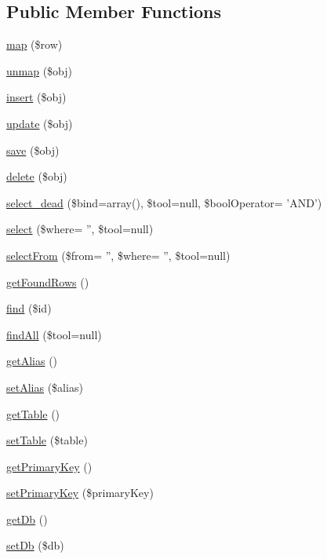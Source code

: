 \subsection*{Public Member Functions}
\begin{DoxyCompactItemize}
\item 
\hyperlink{classTk_1_1Db_1_1Mapper_a6478e55f0a848b91e571e7c20617ea90}{map} (\$row)
\item 
\hyperlink{classTk_1_1Db_1_1Mapper_a42a9e4d6c1eb19c9cc8c20f2787d90e2}{unmap} (\$obj)
\item 
\hyperlink{classTk_1_1Db_1_1Mapper_ae83a5bb881604c413bf1c5a4426607fc}{insert} (\$obj)
\item 
\hyperlink{classTk_1_1Db_1_1Mapper_a7c2c32cb1ed1ddc901d2836e1ec91d1e}{update} (\$obj)
\item 
\hyperlink{classTk_1_1Db_1_1Mapper_ab0d9397cb13a298219d397a21ae3c23d}{save} (\$obj)
\item 
\hyperlink{classTk_1_1Db_1_1Mapper_a6d5a5b414c94e4843f9b6d854f3e7e0d}{delete} (\$obj)
\item 
\hyperlink{classTk_1_1Db_1_1Mapper_af203141f6197f73ba20bf4424ad66830}{select\+\_\+dead} (\$bind=array(), \$tool=null, \$bool\+Operator= 'A\+N\+D')
\item 
\hyperlink{classTk_1_1Db_1_1Mapper_a41878a15b2ebe9af3418637455a66e38}{select} (\$where= '', \$tool=null)
\item 
\hyperlink{classTk_1_1Db_1_1Mapper_ac12d57a915ffad8f87ce34cab8f53d40}{select\+From} (\$from= '', \$where= '', \$tool=null)
\item 
\hyperlink{classTk_1_1Db_1_1Mapper_a493992f673db41af8f5ee525bb7ffd63}{get\+Found\+Rows} ()
\item 
\hyperlink{classTk_1_1Db_1_1Mapper_a94f0505eb8c5512a1b7b14e62e580993}{find} (\$id)
\item 
\hyperlink{classTk_1_1Db_1_1Mapper_ae402ca788692a783ee9d58f2159e5fe3}{find\+All} (\$tool=null)
\item 
\hyperlink{classTk_1_1Db_1_1Mapper_a4a222ebe465531167346f73b0b3094cd}{get\+Alias} ()
\item 
\hyperlink{classTk_1_1Db_1_1Mapper_a5ae0723c03453091af94770e0d788c8b}{set\+Alias} (\$alias)
\item 
\hyperlink{classTk_1_1Db_1_1Mapper_a197308b94af9aec7eeec9aee3f0cac67}{get\+Table} ()
\item 
\hyperlink{classTk_1_1Db_1_1Mapper_a0960439c343e9c201ad4e0c0fd23b986}{set\+Table} (\$table)
\item 
\hyperlink{classTk_1_1Db_1_1Mapper_ae07dc57e6b1c1177134b604ba07fab52}{get\+Primary\+Key} ()
\item 
\hyperlink{classTk_1_1Db_1_1Mapper_ae332c91e8eebf834fcb81634afef8999}{set\+Primary\+Key} (\$primary\+Key)
\item 
\hyperlink{classTk_1_1Db_1_1Mapper_a4333b39f7c54f0ea4147505ca6a9af8a}{get\+Db} ()
\item 
\hyperlink{classTk_1_1Db_1_1Mapper_a972bf63249a6768b3541bb3fdbfc2145}{set\+Db} (\$db)
\end{DoxyCompactItemize}
